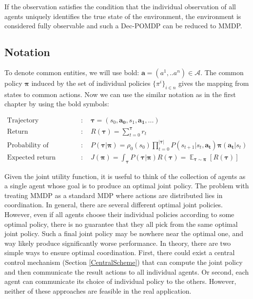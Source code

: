 If the observation satisfies the condition that the individual observation of all agents uniquely identifies the true state of the environment, the environment is considered fully observable and such a Dec-POMDP can be reduced to MMDP.
\subsection*{Notation}
To denote common entities, we will use bold:
$\boldsymbol{a}=(a^1,..a^n) \in \mathcal{A}$.
The common policy $\boldsymbol{\pi}$ induced by the set of individual policies ${\{\pi^i\}}_{i \in n}$ gives the mapping from states to common actions.
Now we can use the similar notation as in the first chapter by using the bold symbols:

\begin{align*}    
        \textrm{Trajectory}&: \quad \boldsymbol{\tau} = (s_0, \boldsymbol{a_0}, s_1, \boldsymbol{a_1}, ...) \\
        \textrm{Return}&: \quad R(\boldsymbol{\tau}) = \sum_{t=0}^{\boldsymbol{\tau}}r_t  \\
        \textrm{Probability of trajectory}&: \quad P(\boldsymbol{\tau}|\boldsymbol{\pi}) = \rho_0(s_0) \prod_{t=0}^{|\boldsymbol{\tau}|} P(s_{t+1}|s_t,\boldsymbol{a_t})\boldsymbol{\pi}(\boldsymbol{a_t}|s_t) \\
        \textrm{Expected return}&: \quad J(\boldsymbol{\pi})=\int_{\boldsymbol{\tau}} P(\boldsymbol{\tau}|\boldsymbol{\pi})R(\boldsymbol{\tau})= \mathop{\mathbb{E}}_{\boldsymbol{\tau} \sim \boldsymbol{\pi}}[R(\boldsymbol{\tau})]
\end{align*}


Given the joint utility function, it is useful to think of the collection of agents as a single agent whose goal is to produce an optimal joint policy.
The problem with treating MMDP as a standard MDP where actions are distributed lies in coordination.
In general, there are several different optimal joint policies.
However, even if all agents choose their individual policies according to some optimal policy, there is no guarantee that they all pick from the same optimal joint policy.
Such a final joint policy may be nowhere near the optimal one, and way likely produce significantly worse performance.
In theory, there are two simple ways to ensure optimal coordination.
First, there could exist a central control mechanism (Section \ref{CentralScheme}) that can compute the joint policy and then communicate the result actions to all individual agents.
Or second, each agent can communicate its choice of individual policy to the others.
However, neither of these approaches are feasible in the real application.

